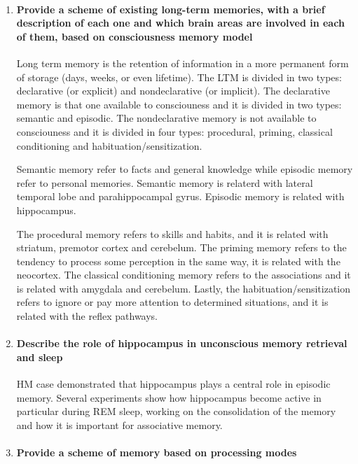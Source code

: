 \documentclass[12pt,article,oneside,a4paper]{memoir}
\begin{document}
\begin{enumerate}
\item \paragraph{Provide a scheme of existing long-term memories, with a brief
description of each one and which brain areas are involved in each of them,
based on consciousness memory model}

Long term memory is the retention of information in a more permanent form of
storage (days, weeks, or even lifetime). The LTM is divided in two types:
declarative (or explicit) and nondeclarative (or implicit).
The declarative memory is that one available to consciouness and it is divided
in two types: semantic and episodic. The nondeclarative memory is not available
to consciouness and it is divided in four types: procedural, priming, classical
conditioning and habituation/sensitization.

Semantic memory refer to facts and general knowledge while episodic memory
refer to personal memories. Semantic memory is relaterd with lateral temporal
lobe and parahippocampal gyrus. Episodic memory is related with hippocampus.

The procedural memory refers to skills and habits, and it is related with
striatum, premotor cortex and cerebelum. The priming memory refers to the
tendency to process some perception in the same way, it is related with the
neocortex. The classical conditioning memory refers to the associations and it
is related with amygdala and cerebelum. Lastly, the habituation/sensitization
refers to ignore or pay more attention to determined situations, and it is
related with the reflex pathways.

\item \paragraph{Describe the role of hippocampus in unconscious memory
retrieval and sleep}

HM case demonstrated that hippocampus plays a central role in episodic memory.
Several experiments show how hippocampus become active in particular during REM
sleep, working on the consolidation of the memory and how it is important for
associative memory.

\item \paragraph{Provide a scheme of memory based on processing modes}


\end{enumerate}
\end{document}
